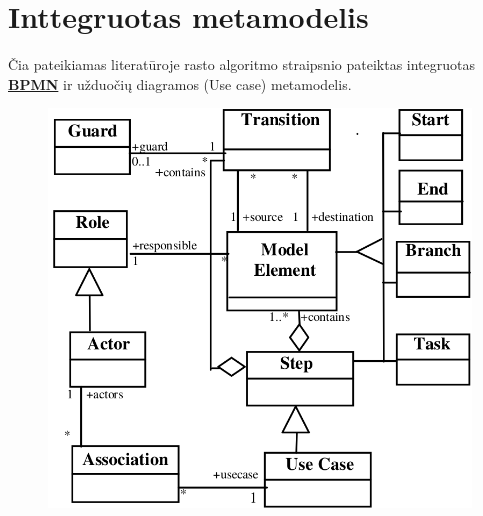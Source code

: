 \documentclass{VUMIFInfBakalaurinis}
\newcommand{\bhyperref}[2]{\hyperref[#1]{\textbf{#2}}}
\newcommand{\BPMN}{\bhyperref{section:bpmn}{BPMN}}
\begin{document}
\section{Inttegruotas metamodelis} \label{appendix:lit_alg_metamodels_integrated}
Čia pateikiamas literatūroje rasto algoritmo straipsnio \cite{algUseCasesFromBpmn} pateiktas integruotas \BPMN{} ir užduočių diagramos (Use case) metamodelis.
\begin{figure}[H]
    \centering
    \includegraphics[width=\textwidth]{img/appendix/literature_algorythm/integrated_metamodel}
\end{figure}
\end{document}
